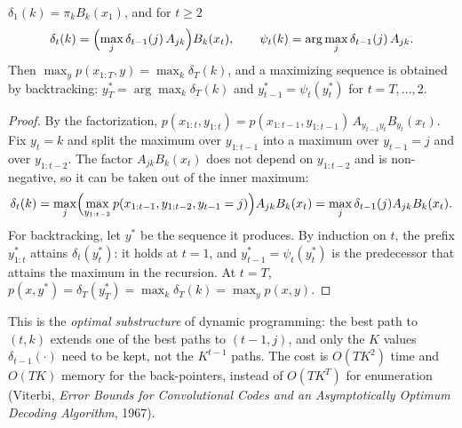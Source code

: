 \begin{notechapter}
\begin{theorem}\label{hmm-viterbi:thm:viterbi}
$\delta_1(k) = \pi_kB_k(x_1)$, and for $t\geq2$
\[
  \delta_t(k) = \Bigl(\max_j\delta_{t-1}(j)\,A_{jk}\Bigr)B_k(x_t),\qquad\psi_t(k) = \arg\max_j\delta_{t-1}(j)\,A_{jk} .
\]
Then $\max_yp(x_{1:T}, y) = \max_k\delta_T(k)$, and a maximizing sequence is obtained by backtracking:
$y_T^* = \arg\max_k\delta_T(k)$ and $y_{t-1}^* = \psi_t(y_t^*)$ for $t = T,\dots,2$.
\end{theorem}

\begin{proof}
By the factorization, $p(x_{1:t}, y_{1:t}) = p(x_{1:t-1}, y_{1:t-1})\,A_{y_{t-1}y_t}B_{y_t}(x_t)$. Fix $y_t = k$ and split the maximum over $y_{1:t-1}$ into a
maximum over $y_{t-1} = j$ and over $y_{1:t-2}$. The factor $A_{jk}B_k(x_t)$ does not depend on $y_{1:t-2}$ and is non-negative,
so it can be taken out of the inner maximum:
\[
  \delta_t(k) = \max_j\Bigl(\max_{y_{1:t-2}}p(x_{1:t-1}, y_{1:t-2}, y_{t-1} = j)\Bigr)A_{jk}B_k(x_t) = \max_j\delta_{t-1}(j)A_{jk}B_k(x_t) .
\]
For backtracking, let $y^*$ be the sequence it produces. By induction on $t$, the prefix $y_{1:t}^*$ attains $\delta_t(y_t^*)$:
it holds at $t = 1$, and $y_{t-1}^* = \psi_t(y_t^*)$ is the predecessor that attains the maximum in the recursion. At $t = T$,
$p(x, y^*) = \delta_T(y_T^*) = \max_k\delta_T(k) = \max_yp(x, y)$.
\end{proof}

This is the \emph{optimal substructure} of dynamic programming: the best path to $(t, k)$ extends one of the
best paths to $(t - 1, j)$, and only the $K$ values $\delta_{t-1}(\cdot)$ need to be kept, not the $K^{t-1}$ paths. The cost is
$O(TK^2)$ time and $O(TK)$ memory for the back-pointers, instead of $O(TK^T)$ for enumeration (Viterbi, \emph{Error
Bounds for Convolutional Codes and an Asymptotically Optimum Decoding Algorithm}, 1967).


\end{notechapter}
